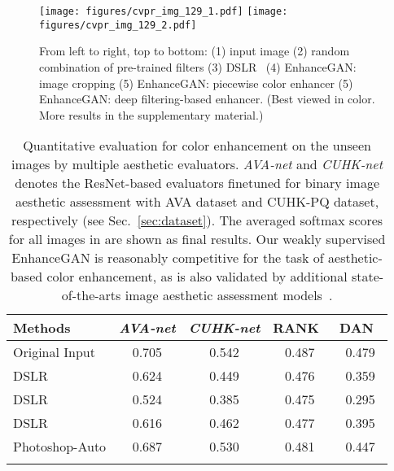 \documentclass[sigconf]{acmart}
\begin{document}
\begin{figure}[t]
\begin{center}
\texttt{[image: figures/cvpr\_img\_129\_1.pdf]}
\texttt{[image: figures/cvpr\_img\_129\_2.pdf]}
\end{center}
\vskip -0.3cm
\caption{From left to right, top to bottom: (1) input image (2) random combination of pre-trained filters (3) DSLR~\cite{ignatov2017dslr} (4) EnhanceGAN: image cropping (5) EnhanceGAN: piecewise color enhancer (5) EnhanceGAN: deep filtering-based enhancer. (Best viewed in color. More results in the supplementary material.) }
\label{fig:BigFig}
\end{figure}
\begin{table}[h]
\centering
\caption{Quantitative evaluation for color enhancement on the unseen  images by multiple aesthetic evaluators. \textit{AVA-net} and \textit{CUHK-net} denotes the ResNet-based evaluators finetuned for binary image aesthetic assessment with AVA dataset and CUHK-PQ dataset, respectively (see Sec.~\ref{sec:dataset}). The averaged softmax scores for all images in  are shown as final results.
Our weakly supervised EnhanceGAN is reasonably competitive for the task of aesthetic-based color enhancement, as is also validated by additional state-of-the-arts image aesthetic assessment models~\cite{kong2016photo,deng2017image}.
}
\setlength{\tabcolsep}{1.9 pt}
\begin{tabular}{lcccc}
Methods                                               & \textit{AVA-net} & \textit{CUHK-net} & RANK~\cite{kong2016photo} & DAN~\cite{deng2017image} \\ \hline 
Original Input                                                & 0.705     & 0.542       & 0.487       & 0.479                                    \\
DSLR~\cite{ignatov2017dslr}         & 0.624     & 0.449      & 0.476        & 0.359                                \\
DSLR~\cite{ignatov2017dslr}              & 0.524     & 0.385      & 0.475        & 0.295                                    \\
DSLR~\cite{ignatov2017dslr}      & 0.616     & 0.462      & 0.477        & 0.395                                   \\
Photoshop-Auto                                             & 0.687        & 0.530         & 0.481          & 0.447                                     \\
                                                     &            &             &               &                                                  \\                                                   

\end{tabular}
\end{table}
\end{document}
